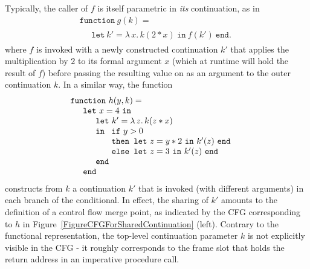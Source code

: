 Typically, the caller of $f$ is itself parametric in \emph{its}
continuation, as in
\begin{equation}
\label{ContinuationCode3}
\begin{array}{l}
\texttt{function}\ g (k) =\\
\quad
\begin{array}{l}
\texttt{let}\ k' = \lambda\, x .\, k (2*x)\ \texttt{in}\ f(k')\ \texttt{end}.
\end{array}
\end{array}
\end{equation}
where $f$ is invoked with a newly constructed continuation $k'$ that
applies the multiplication by $2$ to its formal
argument $x$ (which at runtime will hold the result of $f$) before
passing the resulting value on as an argument to the outer
continuation $k$.
In a similar way, the function
\begin{equation}
\label{ContinuationCode4}
\begin{array}{l}
\texttt{function}\ h (y, k) =\\
\quad
  \begin{array}{l}
    \texttt{let}\ x=4\ \texttt{in} \\
    \quad \begin{array}{l}
            \texttt{let}\ k' = \lambda\, z .\, k (z*x)\\
            \texttt{in}\
               \begin{array}[t]{l}
                 \texttt{if}\ y>0\\
                 \texttt{then\ let}\ z = y*2\ \texttt{in}\ k'(z)\ \texttt{end}\\
                 \texttt{else\ let}\ z = 3\ \texttt{in}\ k'(z)\ \texttt{end}
               \end{array}\\
            \texttt{end}
          \end{array} \\
    \texttt{end}
  \end{array}
\end{array}
\end{equation}
constructs from $k$ a continuation $k'$ that is invoked (with
different arguments) in each branch of the conditional. In effect,
the sharing of $k'$ amounts to the definition of a control flow merge
point, as indicated by the CFG corresponding to $h$ in
Figure~\ref{FigureCFGForSharedContinuation} (left).  Contrary to the
functional representation, the top-level continuation parameter $k$ is
not explicitly visible in the CFG - it roughly corresponds to the
frame slot that holds the return address in an imperative procedure
call.

